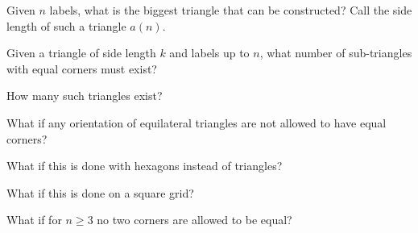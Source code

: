\documentclass{article}
\begin{document}
\begin{question}
  Given $n$ labels, what is the biggest triangle that can be constructed?
  Call the side length of such a triangle $a(n)$.
\end{question}
\begin{related}
  \item Given a triangle of side length $k$ and labels up to $n$, what number
    of sub-triangles with equal corners must exist?
  \item How many such triangles exist?
  \item What if any orientation of equilateral triangles are not allowed to have equal corners?
  \item What if this is done with hexagons instead of triangles?
  \item What if this is done on a square grid?
  \item What if for $n \geq 3$ no two corners are allowed to be equal?
\end{related}
\end{document}
